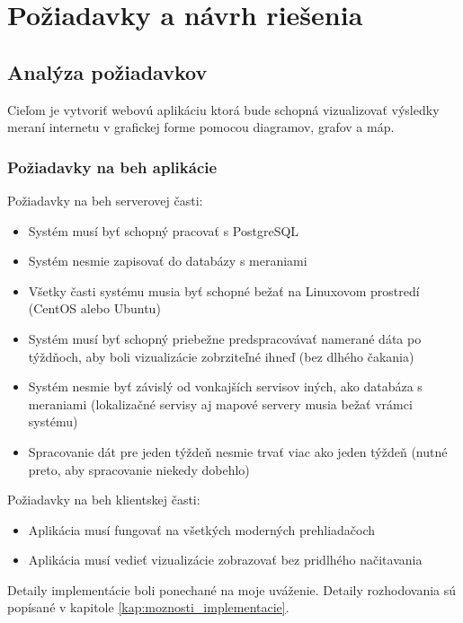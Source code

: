 \chapter{Požiadavky a návrh riešenia}

\label{kap:navrh_riesenia}

\section{Analýza požiadavkov}

Cieľom je vytvoriť webovú aplikáciu ktorá bude schopná vizualizovať výsledky meraní internetu v grafickej forme pomocou diagramov, 
grafov a máp. 

\subsection{Požiadavky na beh aplikácie}

Požiadavky na beh serverovej časti:
\begin{itemize}
    \item Systém musí byť schopný pracovať s PostgreSQL
    \item Systém nesmie zapisovať do databázy s meraniami
    \item Všetky časti systému musia byť schopné bežať na Linuxovom prostredí (CentOS alebo Ubuntu)
    \item Systém musí byť schopný priebežne predspracovávať namerané dáta po týždňoch, 
    aby boli vizualizácie zobrziteľné ihneď (bez dlhého čakania)
    \item Systém nesmie byť závislý od vonkajších servisov iných, ako databáza s meraniami 
    (lokalizačné servisy aj mapové servery musia bežať vrámci systému)
    \item Spracovanie dát pre jeden týždeň nesmie trvať viac ako jeden týždeň (nutné preto, aby spracovanie niekedy dobehlo)
\end{itemize}
Požiadavky na beh klientskej časti:
\begin{itemize}
    \item Aplikácia musí fungovať na všetkých moderných prehliadačoch
    \item Aplikácia musí vedieť vizualizácie zobrazovať bez pridlhého načitavania
\end{itemize}

Detaily implementácie boli ponechané na moje uváženie. Detaily rozhodovania sú popísané v kapitole \ref{kap:moznosti_implementacie}.

